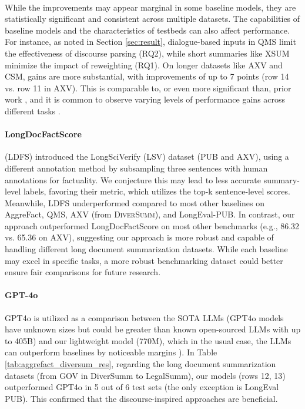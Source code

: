 \paragraph{}
While the improvements may appear marginal in some baseline models, they are statistically significant and consistent across multiple datasets. The capabilities of baseline models and the characteristics of testbeds can also affect performance. For instance, as noted in Section \ref{sec:result}, dialogue-based inputs in QMS limit the effectiveness of discourse parsing (RQ2), while short summaries like XSUM minimize the impact of reweighting (RQ1). On longer datasets like AXV and CSM, gains are more substantial, with improvements of up to 7 points (row 14 vs. row 11 in AXV). This is comparable to, or even more significant than, prior work \cite{zhang-etal-2024-fine}, and it is common to observe varying levels of performance gains across different tasks \cite{tang-etal-2023-understanding,tang2024minicheck}.

\paragraph{LongDocFactScore} (LDFS) introduced the LongSciVerify (LSV) dataset (PUB and AXV), using a different annotation method by subsampling three sentences with human annotations for factuality. We conjecture this may lead to less accurate summary-level labels, favoring their metric, which utilizes the top-k sentence-level scores. Meanwhile, LDFS underperformed compared to most other baselines on AggreFact, QMS, AXV (from \textsc{DiverSumm}), and LongEval-PUB. In contrast, our approach outperformed LongDocFactScore on most other benchmarks (e.g., 86.32 vs. 65.36 on AXV), suggesting our approach is more robust and capable of handling different long document summarization datasets. While each baseline may excel in specific tasks, a more robust benchmarking dataset could better ensure fair comparisons for future research.

\paragraph{GPT-4o} GPT4o is utilized as a comparison between the SOTA LLMs (GPT4o models have unknown sizes but could be greater than known open-sourced LLMs with up to 405B) and our lightweight model (770M), which in the usual case, the LLMs can outperform baselines by noticeable margins \cite{tang2024minicheck}). In Table \ref{tab:aggrefact_diversum_res}, regarding the long document summarization datasets (from GOV in DiverSumm to LegalSumm), our models (rows 12, 13) outperformed GPT4o in 5 out of 6 test sets (the only exception is LongEval PUB). This confirmed that the discourse-inspired approaches are beneficial.

